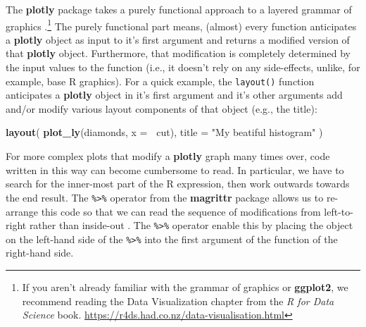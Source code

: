 \documentclass[
  12pt,
]{krantz}
\newenvironment{Shaded}{\begin{snugshade}}{\end{snugshade}}
\newcommand{\DataTypeTok}[1]{\textcolor[rgb]{0.13,0.29,0.53}{#1}}
\newcommand{\KeywordTok}[1]{\textcolor[rgb]{0.13,0.29,0.53}{\textbf{#1}}}
\newcommand{\NormalTok}[1]{#1}
\newcommand{\OperatorTok}[1]{\textcolor[rgb]{0.81,0.36,0.00}{\textbf{#1}}}
\newcommand{\StringTok}[1]{\textcolor[rgb]{0.31,0.60,0.02}{#1}}
\begin{document}
The \textbf{plotly} package takes a purely functional approach to a layered grammar of graphics \citep{ggplot2-paper}.\footnote{If you aren't already familiar with the grammar of graphics or \textbf{ggplot2}, we recommend reading the Data Visualization chapter from the \emph{R for Data Science} book. \url{https://r4ds.had.co.nz/data-visualisation.html}} The purely functional part means, (almost) every function anticipates a \textbf{plotly} object as input to it's first argument and returns a modified version of that \textbf{plotly} object. Furthermore, that modification is completely determined by the input values to the function (i.e., it doesn't rely on any side-effects, unlike, for example, base R graphics). For a quick example, the \texttt{layout()} function anticipates a \textbf{plotly} object in it's first argument and it's other arguments add and/or modify various layout components of that object (e.g., the title):

\begin{Shaded}
\begin{Highlighting}[]
\KeywordTok{layout}\NormalTok{(}
  \KeywordTok{plot_ly}\NormalTok{(diamonds, }\DataTypeTok{x =} \OperatorTok{~}\NormalTok{cut),}
  \DataTypeTok{title =} \StringTok{"My beatiful histogram"}
\NormalTok{)}
\end{Highlighting}
\end{Shaded}

For more complex plots that modify a \textbf{plotly} graph many times over, code written in this way can become cumbersome to read. In particular, we have to search for the inner-most part of the R expression, then work outwards towards the end result. The \texttt{\%\textgreater{}\%} operator from the \textbf{magrittr} package allows us to re-arrange this code so that we can read the sequence of modifications from left-to-right rather than inside-out \citep{magrittr}. The \texttt{\%\textgreater{}\%} operator enable this by placing the object on the left-hand side of the \texttt{\%\textgreater{}\%} into the first argument of the function of the right-hand side.

\begin{Shaded}
\end{Shaded}
\end{document}
